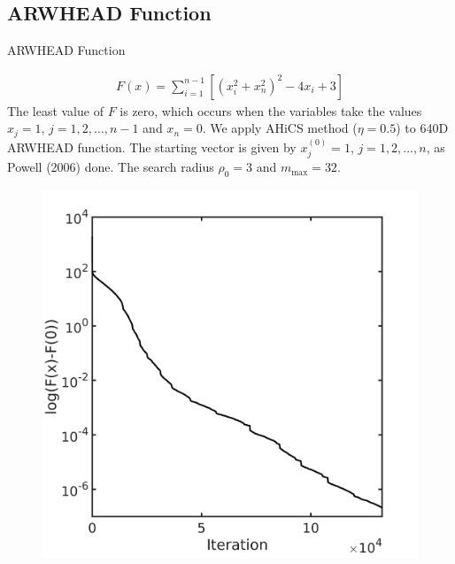 \documentclass{beamer}
\begin{document}
\subsection{ARWHEAD Function}
\begin{frame}{ARWHEAD Function}

\footnotesize{
\begin{align*}
	F(x) = \sum_{i=1}^{n-1}[(x_i^2+x_n^2)^2 - 4 x_i +3]
\end{align*}
The least value of $F$ is zero, which occurs when the variables take the values
$x_j=1$, $j=1,2,\dots,n-1$ and $x_n=0$. We apply AHiCS method
($\eta=0.5$) to 640D ARWHEAD function.
The starting vector is given by $x_j^{(0)}=1$, $j=1,2,\dots,n$, as
Powell (2006) done. The search radius $\rho_0=3$ and $m_{\max}=32$.
}
%
\begin{figure}[!htbp]
	\centering
	  \includegraphics[scale=0.2]{./figures/arwhead640D.png}

\end{figure}
\end{frame}
\end{document}
